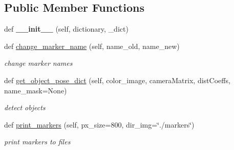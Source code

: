 \subsection*{Public Member Functions}
\begin{DoxyCompactItemize}
\item 
\mbox{\label{classrnb-planning_1_1src_1_1pkg_1_1detector_1_1aruco_1_1detector_1_1_aruco_map_a2f521b4f4a67f25140f3af2f109fb20f}} 
def {\bfseries \+\_\+\+\_\+init\+\_\+\+\_\+} (self, dictionary, \+\_\+dict)
\item 
\mbox{\label{classrnb-planning_1_1src_1_1pkg_1_1detector_1_1aruco_1_1detector_1_1_aruco_map_ac20f07643747d3903b920797e8f6b6fb}} 
def \hyperlink{classrnb-planning_1_1src_1_1pkg_1_1detector_1_1aruco_1_1detector_1_1_aruco_map_ac20f07643747d3903b920797e8f6b6fb}{change\+\_\+marker\+\_\+name} (self, name\+\_\+old, name\+\_\+new)
\begin{DoxyCompactList}\small\item\em change marker names \end{DoxyCompactList}\item 
\mbox{\label{classrnb-planning_1_1src_1_1pkg_1_1detector_1_1aruco_1_1detector_1_1_aruco_map_a57759cb318b5c574cc24559d3ae42294}} 
def \hyperlink{classrnb-planning_1_1src_1_1pkg_1_1detector_1_1aruco_1_1detector_1_1_aruco_map_a57759cb318b5c574cc24559d3ae42294}{get\+\_\+object\+\_\+pose\+\_\+dict} (self, color\+\_\+image, camera\+Matrix, dist\+Coeffs, name\+\_\+mask=None)
\begin{DoxyCompactList}\small\item\em detect objects \end{DoxyCompactList}\item 
\mbox{\label{classrnb-planning_1_1src_1_1pkg_1_1detector_1_1aruco_1_1detector_1_1_aruco_map_aa4aa31503b2e78c1294027debee912f7}} 
def \hyperlink{classrnb-planning_1_1src_1_1pkg_1_1detector_1_1aruco_1_1detector_1_1_aruco_map_aa4aa31503b2e78c1294027debee912f7}{print\+\_\+markers} (self, px\+\_\+size=800, dir\+\_\+img=\char`\"{}./markers\char`\"{})
\begin{DoxyCompactList}\small\item\em print markers to files \end{DoxyCompactList}\item 

\end{DoxyCompactItemize}
